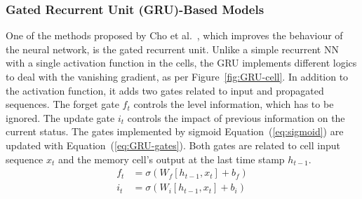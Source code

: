%
\subsubsection{Gated Recurrent Unit (GRU)-Based Models} \label{subsub:gru}
One of the methods proposed by Cho et al.~\cite{GRU_cho_properties_2014}, which improves the behaviour of the neural network, is the gated recurrent unit.
{Unlike a simple recurrent NN with a single activation function in the cells, the GRU implements different logics to deal with the vanishing gradient, as per \mbox{Figure~\ref{fig:GRU-cell}}.}
In addition to the activation function, it adds two gates related to input and propagated sequences.
The forget gate $f_t$ controls the level information, which has to be ignored.
The update gate $i_t$ controls the impact of previous information on the current status.
The gates implemented by sigmoid \mbox{Equation~(\ref{eq:sigmoid})} are updated with \mbox{Equation~(\ref{eq:GRU-gates})}.
Both gates are related to cell input sequence $x_t$ and the memory cell's output at the last time stamp $h_{t-1}$.
\begin{equation}
    \begin{split}
        f_t &= \sigma \left( W_{f} \left[ h_{t-1}, x_t \right] + b_f \right) \\
        i_t &= \sigma \left( W_{i} \left[ h_{t-1}, x_t \right] + b_i \right)
    \end{split}
    \label{eq:GRU-gates}
\end{equation}

